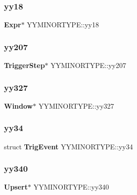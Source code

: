 \mbox{\label{union_y_y_m_i_n_o_r_t_y_p_e_a54965af1d6a8505de5aac24040b0464a}} 
\subsubsection{yy18}
{\footnotesize\ttfamily \textbf{ Expr}$\ast$ Y\+Y\+M\+I\+N\+O\+R\+T\+Y\+P\+E\+::yy18}

\mbox{\label{union_y_y_m_i_n_o_r_t_y_p_e_a98b347a4cec88ed0153c3259b1f800bc}} 
\subsubsection{yy207}
{\footnotesize\ttfamily \textbf{ Trigger\+Step}$\ast$ Y\+Y\+M\+I\+N\+O\+R\+T\+Y\+P\+E\+::yy207}

\mbox{\label{union_y_y_m_i_n_o_r_t_y_p_e_ad4d341dceefe627bc87dcec154b1738d}} 
\subsubsection{yy327}
{\footnotesize\ttfamily \textbf{ Window}$\ast$ Y\+Y\+M\+I\+N\+O\+R\+T\+Y\+P\+E\+::yy327}

\mbox{\label{union_y_y_m_i_n_o_r_t_y_p_e_af01532510175a1451a82135497c01303}} 
\subsubsection{yy34}
{\footnotesize\ttfamily struct \textbf{ Trig\+Event} Y\+Y\+M\+I\+N\+O\+R\+T\+Y\+P\+E\+::yy34}

\mbox{\label{union_y_y_m_i_n_o_r_t_y_p_e_a36e85bdcef6ac3607759398fca889ad1}} 
\subsubsection{yy340}
{\footnotesize\ttfamily \textbf{ Upsert}$\ast$ Y\+Y\+M\+I\+N\+O\+R\+T\+Y\+P\+E\+::yy340}

\mbox{\label{union_y_y_m_i_n_o_r_t_y_p_e_af9a4b217e78d73f07c886d5c84ac5fc9}} 
